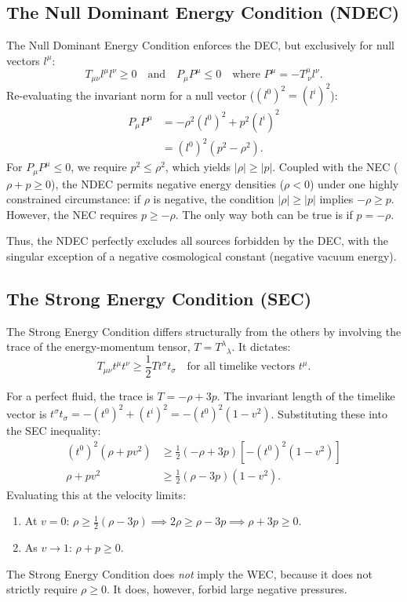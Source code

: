 \documentclass[11pt, a4paper]{report}
\begin{document}
\subsection{The Null Dominant Energy Condition (NDEC)}

The Null Dominant Energy Condition enforces the DEC, but exclusively for null vectors $l^{\mu}$:
\begin{equation}
T_{\mu\nu} l^{\mu} l^{\nu} \ge 0 \quad \text{and} \quad P_{\mu}P^{\mu} \le 0 \quad \text{where } P^{\mu} = -T^{\mu}_{\ \nu} l^{\nu}.
\end{equation}
Re-evaluating the invariant norm for a null vector ($(l^{0})^{2} = (l^{i})^{2}$):
\begin{align}
P_{\mu}P^{\mu} &= -\rho^{2}(l^{0})^{2} + p^{2}(l^{i})^{2} \nonumber \\
&= (l^{0})^{2}(p^{2} - \rho^{2}).
\end{align}
For $P_{\mu}P^{\mu} \le 0$, we require $p^{2} \le \rho^{2}$, which yields $|\rho| \ge |p|$. 
Coupled with the NEC ($\rho + p \ge 0$), the NDEC permits negative energy densities ($\rho < 0$) under one highly constrained circumstance: if $\rho$ is negative, the condition $|\rho| \ge |p|$ implies $-\rho \ge p$. However, the NEC requires $p \ge -\rho$. The only way both can be true is if $p = -\rho$. 

Thus, the NDEC perfectly excludes all sources forbidden by the DEC, with the singular exception of a negative cosmological constant (negative vacuum energy).

\subsection{The Strong Energy Condition (SEC)}

The Strong Energy Condition differs structurally from the others by involving the trace of the energy-momentum tensor, $T = {T^{\lambda}}_{\lambda}$. It dictates:
\begin{equation}
T_{\mu\nu}t^{\mu}t^{\nu} \ge \frac{1}{2} T t^{\sigma}t_{\sigma} \quad \text{for all timelike vectors } t^{\mu}.
\end{equation}

For a perfect fluid, the trace is $T = -\rho + 3p$. The invariant length of the timelike vector is $t^{\sigma}t_{\sigma} = -(t^{0})^{2} + (t^{i})^{2} = -(t^{0})^{2}(1 - v^{2})$. Substituting these into the SEC inequality:
\begin{align}
(t^{0})^{2}(\rho + p v^{2}) &\ge \frac{1}{2} (-\rho + 3p) \left[ -(t^{0})^{2}(1 - v^{2}) \right] \nonumber \\
\rho + p v^{2} &\ge \frac{1}{2} (\rho - 3p)(1 - v^{2}).
\end{align}
Evaluating this at the velocity limits:
\begin{enumerate}
    \item At $v = 0$: $\rho \ge \frac{1}{2}(\rho - 3p) \implies 2\rho \ge \rho - 3p \implies \rho + 3p \ge 0$.
    \item As $v \to 1$: $\rho + p \ge 0$.
\end{enumerate}
The Strong Energy Condition does \textit{not} imply the WEC, because it does not strictly require $\rho \ge 0$. It does, however, forbid large negative pressures.
\end{document}
